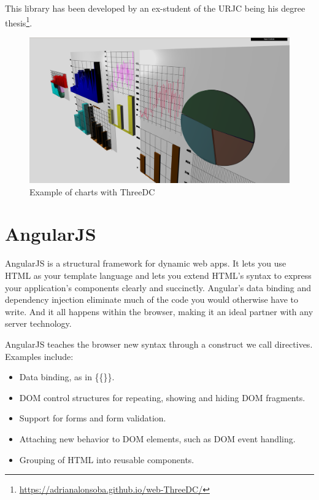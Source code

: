 \documentclass[a4paper, 12pt]{book}
\begin{document}
This library has been developed by an ex-student of the URJC being his degree thesis\footnote{\url{https://adrianalonsoba.github.io/web-ThreeDC/}}.

\begin{figure}[H]
  \centering
  \includegraphics[width=16cm, keepaspectratio]{img/context/threedc.PNG}
  \caption{Example of charts with ThreeDC}
  \label{fig:pluginhtml}
\end{figure}

\section{AngularJS}
\label{sec:angular}
AngularJS is a structural framework for dynamic web apps. It lets you use HTML as your template language and lets you extend HTML's syntax to express your application's components clearly and succinctly. Angular's data binding and dependency injection eliminate much of the code you would otherwise have to write. And it all happens within the browser, making it an ideal partner with any server technology.

AngularJS teaches the browser new syntax through a construct we call directives. Examples include:

\begin{itemize}
\item Data binding, as in \{\{\}\}.
\item DOM control structures for repeating, showing and hiding DOM fragments.
\item Support for forms and form validation.
\item Attaching new behavior to DOM elements, such as DOM event handling.
\item Grouping of HTML into reusable components.
\end{itemize}
\end{document}
